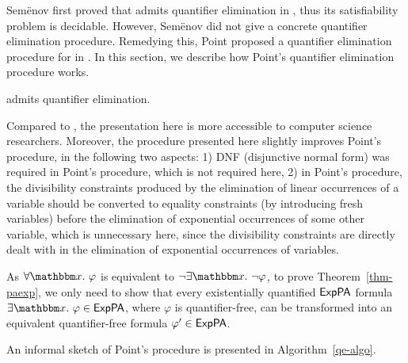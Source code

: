 
Semënov first proved that  {\paexp} admits quantifier elimination in \cite{Semenov84}, thus its satisfiability problem is decidable. However, Semënov did not give a concrete quantifier elimination procedure. Remedying this, Point proposed a quantifier elimination procedure for {\paexp} in \cite{Point86}. In this section, we describe how Point's quantifier elimination procedure works. 

%
\begin{theorem}
\label{thm-paexp}
{\paexp} admits quantifier elimination. 
\end{theorem}

Compared to \cite{Point86}, the presentation here is more accessible to computer science researchers. Moreover, the procedure presented here slightly improves Point's procedure, in the following two aspects: 1) DNF (disjunctive normal form) was required in Point's procedure, which is not required here, 2) in Point's procedure, the divisibility constraints produced by the elimination of linear occurrences of a variable should be converted to equality constraints (by introducing fresh variables) before the elimination of exponential occurrences of some other variable, which is unnecessary here, since the divisibility constraints are directly dealt with in the elimination of exponential occurrences of variables. 

As $\forall \ivarx. \ \varphi$ is equivalent to $\neg \exists \ivarx. \ \neg \varphi$, to prove Theorem~\ref{thm-paexp}, we only need to show that every existentially quantified ${\sf ExpPA}$ formula $\exists \ivarx.\ \varphi \in \paexp$, where $\varphi$ is quantifier-free, can be transformed into an equivalent quantifier-free formula $\varphi' \in {\sf ExpPA}$. 

An informal sketch of Point's procedure is presented in Algorithm~\ref{qe-algo}.



